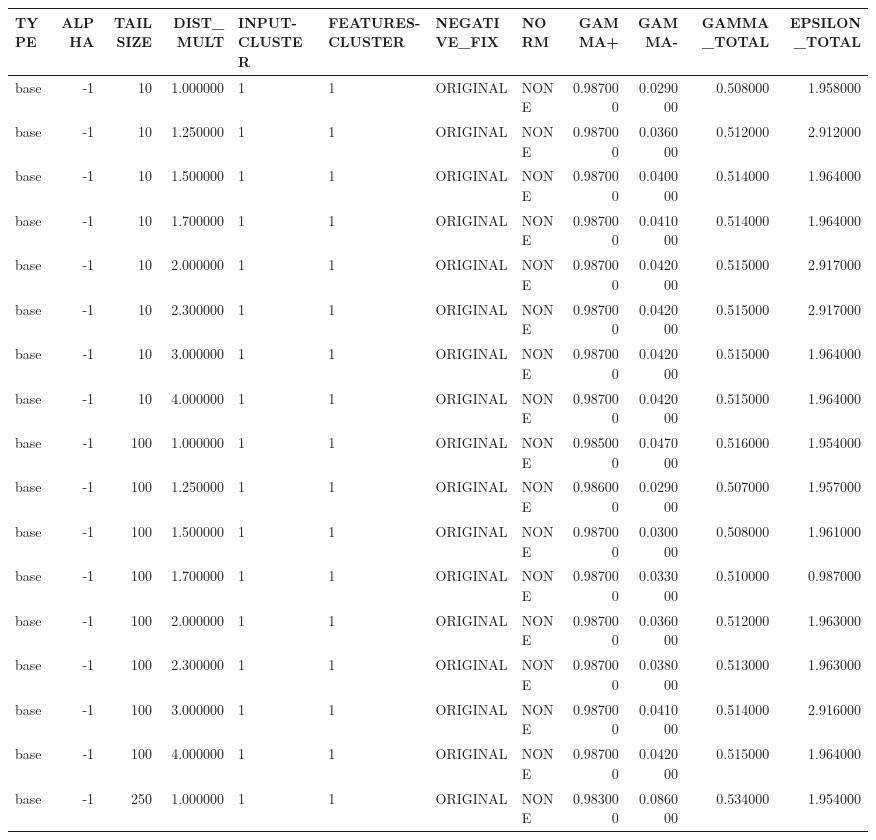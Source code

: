 \begin{tabular}{lrrrllllrrrr}
\toprule
TYPE & ALPHA & TAILSIZE & DIST_MULT & INPUT-CLUSTER & FEATURES-CLUSTER & NEGATIVE_FIX & NORM & GAMMA+ & GAMMA- & GAMMA_TOTAL & EPSILON_TOTAL \\
\midrule
base & -1 & 10 & 1.000000 & 1 & 1 & ORIGINAL & NONE & 0.987000 & 0.029000 & 0.508000 & 1.958000 \\
base & -1 & 10 & 1.250000 & 1 & 1 & ORIGINAL & NONE & 0.987000 & 0.036000 & 0.512000 & 2.912000 \\
base & -1 & 10 & 1.500000 & 1 & 1 & ORIGINAL & NONE & 0.987000 & 0.040000 & 0.514000 & 1.964000 \\
base & -1 & 10 & 1.700000 & 1 & 1 & ORIGINAL & NONE & 0.987000 & 0.041000 & 0.514000 & 1.964000 \\
base & -1 & 10 & 2.000000 & 1 & 1 & ORIGINAL & NONE & 0.987000 & 0.042000 & 0.515000 & 2.917000 \\
base & -1 & 10 & 2.300000 & 1 & 1 & ORIGINAL & NONE & 0.987000 & 0.042000 & 0.515000 & 2.917000 \\
base & -1 & 10 & 3.000000 & 1 & 1 & ORIGINAL & NONE & 0.987000 & 0.042000 & 0.515000 & 1.964000 \\
base & -1 & 10 & 4.000000 & 1 & 1 & ORIGINAL & NONE & 0.987000 & 0.042000 & 0.515000 & 1.964000 \\
base & -1 & 100 & 1.000000 & 1 & 1 & ORIGINAL & NONE & 0.985000 & 0.047000 & 0.516000 & 1.954000 \\
base & -1 & 100 & 1.250000 & 1 & 1 & ORIGINAL & NONE & 0.986000 & 0.029000 & 0.507000 & 1.957000 \\
base & -1 & 100 & 1.500000 & 1 & 1 & ORIGINAL & NONE & 0.987000 & 0.030000 & 0.508000 & 1.961000 \\
base & -1 & 100 & 1.700000 & 1 & 1 & ORIGINAL & NONE & 0.987000 & 0.033000 & 0.510000 & 0.987000 \\
base & -1 & 100 & 2.000000 & 1 & 1 & ORIGINAL & NONE & 0.987000 & 0.036000 & 0.512000 & 1.963000 \\
base & -1 & 100 & 2.300000 & 1 & 1 & ORIGINAL & NONE & 0.987000 & 0.038000 & 0.513000 & 1.963000 \\
base & -1 & 100 & 3.000000 & 1 & 1 & ORIGINAL & NONE & 0.987000 & 0.041000 & 0.514000 & 2.916000 \\
base & -1 & 100 & 4.000000 & 1 & 1 & ORIGINAL & NONE & 0.987000 & 0.042000 & 0.515000 & 1.964000 \\
base & -1 & 250 & 1.000000 & 1 & 1 & ORIGINAL & NONE & 0.983000 & 0.086000 & 0.534000 & 1.954000 \\

\end{tabular}
